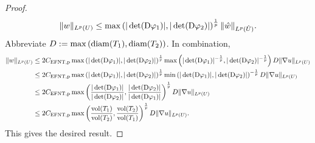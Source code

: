 \documentclass[a4paper]{article}
\begin{document}
\begin{proof}
    \begin{align*}
        \| w \|_{L^{p}(U)}
        \leq 
        \max\left( 
            |\det({\mathrm D} \varphi_1)|
            ,
            |\det({\mathrm D} \varphi_2)|
        \right)^{\frac 1 p}
        \| \hat w \|_{L^{p}(\hat U)}
        .
    \end{align*}
    Abbreviate $D := \max\left( {\operatorname{diam}}(T_1), {\operatorname{diam}}(T_2) \right)$. In combination, 
    \begin{align*}
        \| w \|_{L^{p}(U)}
        &\leq 
        2 C_{\rm{EFNT},p}
        \max\left( 
            |\det({\mathrm D} \varphi_1)|
            ,
            |\det({\mathrm D} \varphi_2)|
        \right)^{\frac 1 p}
        \max\left( 
            |\det({\mathrm D} \varphi_1)|^{-\frac 1 p} 
            ,
            |\det({\mathrm D} \varphi_2)|^{-\frac 1 p} 
        \right)
        D
        \| \nabla u \|_{L^{p}(U)}
        \\&
        \leq 
        2 C_{\rm{EFNT},p}
        \max\left( 
            |\det({\mathrm D} \varphi_1)|
            ,
            |\det({\mathrm D} \varphi_2)|
        \right)^{\frac 1 p}
        \min\left( 
            |\det({\mathrm D} \varphi_1)|
            ,
            |\det({\mathrm D} \varphi_2)| 
        \right)^{-\frac 1 p} 
        D
        \| \nabla u \|_{L^{p}(U)}
        \\&
        \leq 
        2 C_{\rm{EFNT},p}
        \max\left( 
            \frac{ |\det({\mathrm D} \varphi_1)| }{ |\det({\mathrm D} \varphi_2)| }
            ,
            \frac{ |\det({\mathrm D} \varphi_2)| }{ |\det({\mathrm D} \varphi_1)| }
        \right)^{\frac 1 p}
        D
        \| \nabla u \|_{L^{p}(U)}
        \\&
        \leq 
        2 C_{\rm{EFNT},p}
        \max\left( 
            \frac{ \operatorname{vol}(T_1) }{ \operatorname{vol}(T_2) }
            ,
            \frac{ \operatorname{vol}(T_2) }{ \operatorname{vol}(T_1) }
        \right)^{\frac 1 p}
        D
        \| \nabla u \|_{L^{p}(U)}
        .
    \end{align*}
    This gives the desired result. 
\end{proof}
\end{document}
